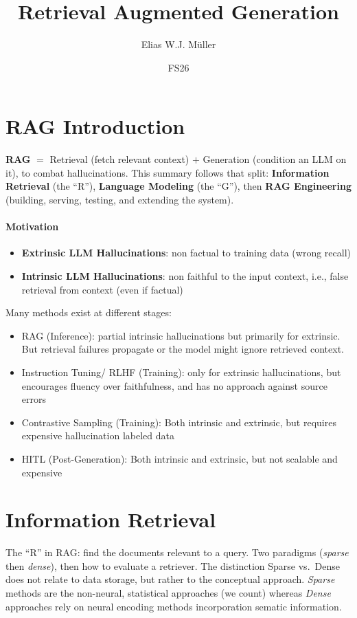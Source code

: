 \documentclass{article}
\title{Retrieval Augmented Generation}
\author{Elias W.J. Müller}
\date{FS26}
\begin{document}
\maketitle

\tableofcontents
\newpage
\section{RAG Introduction}
\textbf{RAG} $=$ Retrieval (fetch relevant context) $+$ Generation (condition an LLM on it), to combat hallucinations. This summary follows that split: \textbf{Information Retrieval} (the ``R''), \textbf{Language Modeling} (the ``G''), then \textbf{RAG Engineering} (building, serving, testing, and extending the system).

\paragraph{Motivation}

\begin{itemize}
    \item \textbf{Extrinsic LLM Hallucinations}: non factual to training data (wrong recall)
    \item \textbf{Intrinsic LLM Hallucinations}: non faithful to the input context, i.e., false retrieval from context (even if factual)
\end{itemize}

Many methods exist at different stages:
\begin{itemize}
    \item RAG (Inference): partial intrinsic hallucinations but primarily for extrinsic. But retrieval failures propagate or the model might ignore retrieved context.
    \item Instruction Tuning/ RLHF (Training): only for extrinsic hallucinations, but encourages fluency over faithfulness, and has no approach against source errors
    \item Contrastive Sampling (Training): Both intrinsic and extrinsic, but requires expensive hallucination labeled data
    \item HITL (Post-Generation): Both intrinsic and extrinsic, but not scalable and expensive
\end{itemize}

\section{Information Retrieval}
The ``R'' in RAG: find the documents relevant to a query. Two paradigms (\textit{sparse} then \textit{dense}), then how to evaluate a retriever. The distinction Sparse vs.\ Dense does not relate to data storage, but rather to the conceptual approach. \textit{Sparse} methods are the non-neural, statistical approaches (we count) whereas \textit{Dense} approaches rely on neural encoding methods incorporation sematic information. 
\end{document}
